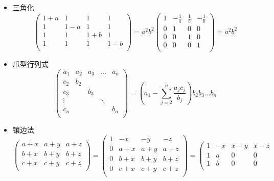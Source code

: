 \documentclass{article}
\begin{document}
\begin{itemize}
$$					$$
					\item 三角化
					$$
					\left(\begin{array}{cccc}
						1+a & 1 & 1 & 1 \\
						1 & 1-a & 1 & 1 \\
						1 & 1 & 1+b & 1 \\
						1 & 1 & 1 & 1-b \\
					\end{array}\right)
					=a^2b^2\left(\begin{array}{cccc}
						1 & -\frac{1}{a} & \frac{1}{b} & -\frac{1}{b} \\
						0 & 1 & 0 & 0 \\
						0 & 0 & 1 & 0 \\
						0 & 0 & 0 & 1 \\
					\end{array}\right)
					=a^2b^2
					$$
					\item 爪型行列式
					$$
					\left(\begin{array}{ccccc}
						a_1 & a_2 & a_3 & \dots & a_n \\
						c_2 & b_2 & & & \\
						c_3 & & b_3 & & \\
						\vdots & & & \ddots & \\
						c_n & & & & b_n \\
					\end{array}\right)
					=(a_1-\sum \limits _{j=2}^n\frac{a_jc_j}{b_j})b_2b_3\dots b_n
					$$
					\item 镶边法
					$$
					\left(\begin{array}{ccc}
						a+x & a+y & a+z \\
						b+x & b+y & b+z \\
						c+x & c+y & c+z \\
					\end{array}\right)
					=\left(\begin{array}{cccc}
						1 & -x & -y & -z \\
						0 & a+x & a+y & a+z \\
						0 & b+x & b+y & b+z \\
						0 & c+x & c+y & c+z \\
					\end{array}\right)
					=\left(\begin{array}{cccc}
						1 & -x & x-y & x-z \\
						1 & a & 0 & 0 \\
						1 & b & 0 & 0 \\

\end{array}$$
\end{itemize}
\end{document}
